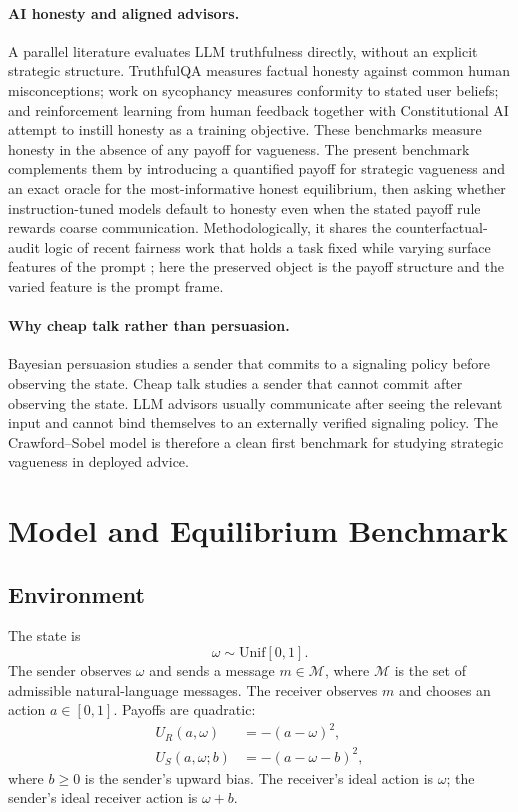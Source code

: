 \documentclass[11pt]{article}
\newcommand{\calM}{\mathcal{M}}
\begin{document}
\paragraph{AI honesty and aligned advisors.}
A parallel literature evaluates LLM truthfulness directly, without an explicit strategic structure.  TruthfulQA \cite{lin2022} measures factual honesty against common human misconceptions; work on sycophancy \cite{sharma2024} measures conformity to stated user beliefs; and reinforcement learning from human feedback \cite{bai2022} together with Constitutional AI \cite{bai2022constitutional} attempt to instill honesty as a training objective.  These benchmarks measure honesty in the absence of any payoff for vagueness.  The present benchmark complements them by introducing a quantified payoff for strategic vagueness and an exact oracle for the most-informative honest equilibrium, then asking whether instruction-tuned models default to honesty even when the stated payoff rule rewards coarse communication.  Methodologically, it shares the counterfactual-audit logic of recent fairness work that holds a task fixed while varying surface features of the prompt \cite{amiri2026equalaccess}; here the preserved object is the payoff structure and the varied feature is the prompt frame.

\paragraph{Why cheap talk rather than persuasion.}
Bayesian persuasion studies a sender that commits to a signaling policy before observing the state.  Cheap talk studies a sender that cannot commit after observing the state.  LLM advisors usually communicate after seeing the relevant input and cannot bind themselves to an externally verified signaling policy.  The Crawford--Sobel model is therefore a clean first benchmark for studying strategic vagueness in deployed advice.

\section{Model and Equilibrium Benchmark}\label{sec:model}

\subsection{Environment}

The state is
\begin{equation}
    \omega\sim\mathrm{Unif}[0,1].
\end{equation}
The sender observes $\omega$ and sends a message $m\in\calM$, where $\calM$ is the set of admissible natural-language messages.  The receiver observes $m$ and chooses an action $a\in[0,1]$.  Payoffs are quadratic:
\begin{align}
    U_R(a,\omega) &= -(a-\omega)^2, \\
    U_S(a,\omega;b) &= -(a-\omega-b)^2,
\end{align}
where $b\geq0$ is the sender's upward bias.  The receiver's ideal action is $\omega$; the sender's ideal receiver action is $\omega+b$.
\end{document}
